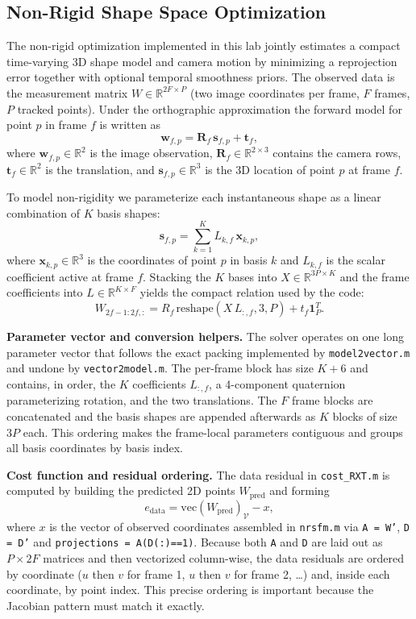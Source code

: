 \documentclass{article}
\begin{document}
\subsection{Non-Rigid Shape Space Optimization}

The non-rigid optimization implemented in this lab jointly estimates a compact time-varying 3D shape model and camera motion by minimizing a reprojection error together with optional temporal smoothness priors. The observed data is the measurement matrix $W\in\mathbb{R}^{2F\times P}$ (two image coordinates per frame, $F$ frames, $P$ tracked points). Under the orthographic approximation the forward model for point $p$ in frame $f$ is written as
\[
	\mathbf{w}_{f,p} = \mathbf{R}_f\,\mathbf{s}_{f,p} + \mathbf{t}_f,
\]
where $\mathbf{w}_{f,p}\in\mathbb{R}^2$ is the image observation, $\mathbf{R}_f\in\mathbb{R}^{2\times3}$ contains the camera rows, $\mathbf{t}_f\in\mathbb{R}^2$ is the translation, and $\mathbf{s}_{f,p}\in\mathbb{R}^3$ is the 3D location of point $p$ at frame $f$.

To model non-rigidity we parameterize each instantaneous shape as a linear combination of $K$ basis shapes:
\[
	\mathbf{s}_{f,p} = \sum_{k=1}^K L_{k,f}\,\mathbf{x}_{k,p},
\]
where $\mathbf{x}_{k,p}\in\mathbb{R}^3$ is the coordinates of point $p$ in basis $k$ and $L_{k,f}$ is the scalar coefficient active at frame $f$. Stacking the $K$ bases into $X\in\mathbb{R}^{3P\times K}$ and the frame coefficients into $L\in\mathbb{R}^{K\times F}$ yields the compact relation used by the code:
\[
	W_{2f-1:2f,:} = R_f\,\mathrm{reshape}(X\,L_{:,f},3,P) + t_f\mathbf{1}_P^T.
\]

\textbf{Parameter vector and conversion helpers.} The solver operates on one long parameter vector that follows the exact packing implemented by \texttt{model2vector.m} and undone by \texttt{vector2model.m}. The per-frame block has size $K+6$ and contains, in order, the $K$ coefficients $L_{:,f}$, a 4-component quaternion parameterizing rotation, and the two translations. The $F$ frame blocks are concatenated and the basis shapes are appended afterwards as $K$ blocks of size $3P$ each. This ordering makes the frame-local parameters contiguous and groups all basis coordinates by basis index.

\textbf{Cost function and residual ordering.} The data residual in \texttt{cost\_RXT.m} is computed by building the predicted 2D points $W_{\mathrm{pred}}$ and forming
\[
	e_{\mathrm{data}} = \mathrm{vec}(W_{\mathrm{pred}})^{}_{\mathcal{V}} - x,
\]
where $x$ is the vector of observed coordinates assembled in \texttt{nrsfm.m} via \texttt{A = W'}, \texttt{D = D'} and \texttt{projections = A(D(:)==1)}. Because both \texttt{A} and \texttt{D} are laid out as $P\times 2F$ matrices and then vectorized column-wise, the data residuals are ordered by coordinate ($u$ then $v$ for frame 1, $u$ then $v$ for frame 2, \ldots) and, inside each coordinate, by point index. This precise ordering is important because the Jacobian pattern must match it exactly.
\end{document}
